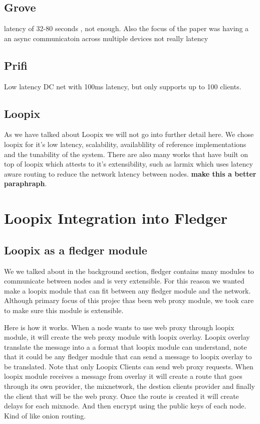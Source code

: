 \documentclass[a4paper,11pt,oneside]{report}
\begin{document}
\subsection{Grove}
latency of 32-80 seconds , not enough. Also the focus of the paper was having a an async communicatoin across multiple devices not really latency
\subsection{Prifi}
Low latency DC net with 100ms latency, but only supports up to 100 clients. 

\subsection{Loopix}
As we have talked about Loopix we will not go into further detail here. We chose loopix for it's low latency, scalability, availablility of reference implementations and the tunability of the system. There are also many works that have built on top of loopix which attests to it's extensibility, such as larmix which uses latency aware routing to reduce the network latency between nodes. \textbf{make this a better paraphraph}.

\section{Loopix Integration into Fledger}
\subsection{Loopix as a fledger module}
We we talked about in the background section, fledger contains many modules to communicate between nodes and is very extensible. For this reason we wanted make a loopix module that can fit between any fledger module and the network. Although primary focus of this projec thas been web proxy module, we took care to make sure this module is extensible.

Here is how it works. When a node wants to use web proxy through loopix module, it will create the web proxy module with loopix overlay. Loopix overlay translate the message into a a format that loopix module can understand, note that it could be any fledger module that can send a message to loopix overlay to be translated. Note that only Loopix Clients can send web proxy requests. When loopix module receives a message from overlay it will create a route that goes through its own provider, the mixnetwork, the destion clients provider and finally the client that will be the web proxy. Once the route is created it will create delays for each mixnode. And then encrypt using the public keys of each node. Kind of like onion routing.
\end{document}
